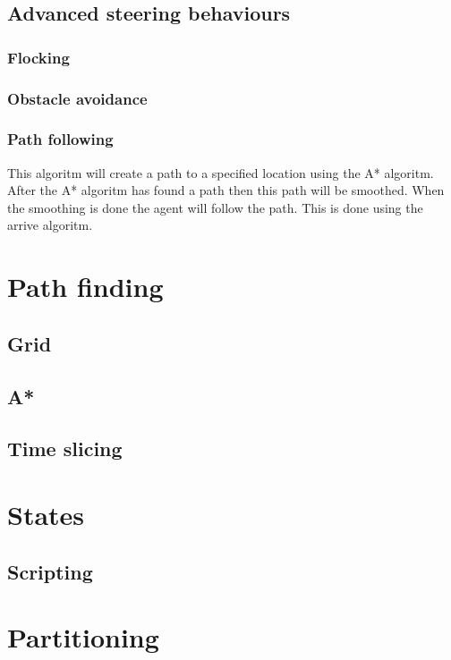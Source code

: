 \documentclass{article}
\begin{document}
  \subsection{Advanced steering behaviours}
  \subsubsection {Flocking}
  
  \subsubsection {Obstacle avoidance}
  
  \subsubsection {Path following}
   This algoritm will create a path to a specified location using the A* algoritm. After the A* algoritm has found a path then this path will be smoothed. When the smoothing is done the agent will follow the path. This is done using the arrive algoritm. 
   \newpage
   \section {Path finding}
   \subsection {Grid}
   \subsection {A*}
   \subsection {Time slicing}
   
   \newpage
   \section {States}
   \subsection {Scripting}
   
   \newpage
   \section {Partitioning}
   
\end{document}
